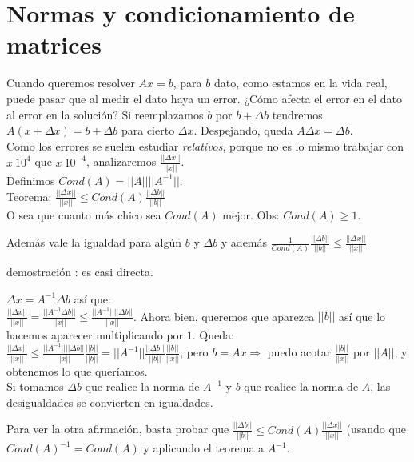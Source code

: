 \documentclass[10pt,a4paper,final]{report}
\begin{document}
\section{Normas y condicionamiento de matrices}
{
	Cuando queremos resolver $Ax=b$, para $b$ dato, como estamos en la vida real, puede pasar que al medir el dato haya un error. ¿Cómo afecta el error en el dato al error en la solución? Si reemplazamos $b$ por $b + \Delta b$ tendremos $A(x+\Delta x) = b + \Delta b$ para cierto $\Delta x$. Despejando, queda $A \Delta x = \Delta b$. \\
	
	Como los errores se suelen estudiar \textit{relativos}, porque no es lo mismo trabajar con $x ~ 10^4$ que $x~10^{-4}$, analizaremos $\frac{||\Delta x ||}{||x||}$. \\
	
	Definimos $Cond(A) = ||A|| ||A^{-1}||$. \\
	
	Teorema: $\frac{||\Delta x|| }{||x||} \leq Cond(A) \frac{||\Delta b|| }{||b||}$\\
	
	O sea que cuanto más chico sea $Cond(A)$ mejor. Obs: $Cond(A) \geq 1$.
	
	Además vale la igualdad para algún $b$ y $\Delta b$ y además $\frac{1}{Cond(A)} \frac{||\Delta b ||}{||b||} \leq \frac{||\Delta x ||}{||x||}$
	
demostración	: es casi directa.

$\Delta x = A^{-1} \Delta b$ así que: \\

$\frac{||\Delta x||}{||x||} = \frac{||A^{-1} \Delta b||}{||x||} \leq \frac{||A^{-1}|| ||\Delta b||}{||x||}$. Ahora bien, queremos que aparezca $||b||$ así que lo hacemos aparecer multiplicando por $1$. Queda: \\

$\frac{||\Delta x||}{||x||} \leq \frac{||A^{-1}|| ||\Delta b||}{||x||} \frac{||b||}{||b||} = ||A^{-1}|| \frac{||\Delta b||}{||b||} \frac{||b||}{||x||}$, pero $b = Ax \Rightarrow$ puedo acotar $\frac{||b||}{||x||}$ por $||A||$, y obtenemos lo que queríamos. \\

Si tomamos $\Delta b$ que realice la norma de $A^{-1}$ y $b$ que realice la norma de $A$, las desigualdades se convierten en igualdades.


Para ver la otra afirmación, basta probar que $\frac{||\Delta b ||}{||b||} \leq Cond(A) \frac{||\Delta x ||}{||x||}$ (usando que $Cond(A)^{-1} = Cond(A)$ y aplicando el teorema a $A^{-1}$.

}
\end{document}
